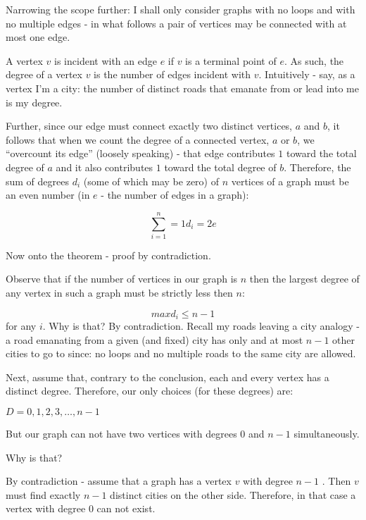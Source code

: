 \begin{enumerate}
            Narrowing the scope further: I shall only consider graphs with no loops and with no multiple edges - in what follows a pair of vertices may be connected with at most one edge.
            
            A vertex $v$ is incident with an edge $e$ if $v$ is a terminal point of $e$. As such, the degree of a vertex $v$ is the number of edges incident with $v$. Intuitively - say, as a vertex I’m a city: the number of distinct roads that emanate from or lead into me is my degree.
            
            Further, since our edge must connect exactly two distinct vertices, $a$ and $b$, it follows that when we count the degree of a connected vertex, $a$ or $b$, we “overcount its edge” (loosely speaking) - that edge contributes $1$ toward the total degree of $a$ and it also contributes $1$ toward the total degree of $b$.
            Therefore, the sum of degrees $d_{i}$ (some of which may be zero) of $n$ vertices of a graph must be an even number (in $e$ - the number of edges in a graph):
            
            $$\sum^{n}_{i=1}=1 d_{i}=2e$$
            
            Now onto the theorem - proof by contradiction.
            
            Observe that if the number of vertices in our graph is $n$ then the largest degree of any vertex in such a graph must be strictly less then $n$:
            
            $$max d_{i} \leq n-1$$
            for any $i$. Why is that? By contradiction. Recall my roads leaving a city analogy - a road emanating from a given (and fixed) city has only and at most $n - 1$ other cities to go to since:
            no loops and
            no multiple roads to the same city
            are allowed.
            
            Next, assume that, contrary to the conclusion, each and every vertex has a distinct degree. Therefore, our only choices (for these degrees) are:
            
            $D={0,1,2,3,\ldots ,n-1}$
            
            But our graph can not have two vertices with degrees $0$ and $n-1$ simultaneously.
            
            Why is that?
            
            By contradiction - assume that a graph has a vertex $v$ with degree $n-1$ . Then $v$ must find exactly $n-1$ distinct cities on the other side. Therefore, in that case a vertex with degree $0$ can not exist.
            

\end{enumerate}
